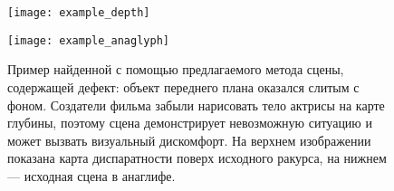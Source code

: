 \begin{figure}[h]
	\begin{minipage}[b]{1.0\linewidth}
		\centering
		\centerline{ \texttt{[image: example\_depth]} }
	\end{minipage}
	\begin{minipage}[b]{1.0\linewidth}
		\centering
		\centerline{ \texttt{[image: example\_anaglyph]} }
	\end{minipage}
    \caption{Пример найденной с помощью предлагаемого метода сцены, содержащей дефект: объект переднего плана оказался слитым с фоном. Создатели фильма забыли нарисовать тело актрисы на карте глубины, поэтому сцена демонстрирует невозможную ситуацию и может вызвать визуальный дискомфорт. На верхнем изображении показана карта диспаратности поверх исходного ракурса, на нижнем --- исходная сцена в анаглифе. }
	\label{fig:example}
\end{figure}
